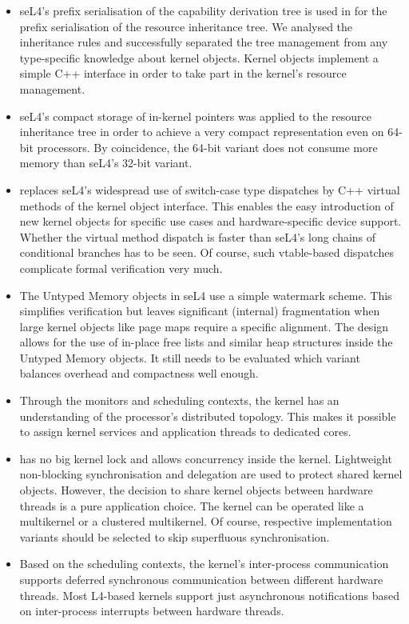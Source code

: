 \begin{itemize}
\item seL4's prefix serialisation of the capability derivation tree is used in \mythos for the prefix serialisation of the resource inheritance tree. We analysed the inheritance rules and successfully separated the tree management from any type-specific knowledge about kernel objects. Kernel objects implement a simple C++ interface in order to take part in the kernel's resource management.
\item seL4's compact storage of in-kernel pointers was applied to the resource inheritance tree in order to achieve a very compact representation even on 64-bit processors. By coincidence, the 64-bit variant does not consume more memory than seL4's 32-bit variant. 
\item \mythos replaces seL4's widespread use of switch-case type dispatches by C++ virtual methods of the kernel object interface. This enables the easy introduction of new kernel objects for specific use cases and hardware-specific device support. Whether the virtual method dispatch is faster than seL4's long chains of conditional branches has to be seen. Of course, such vtable-based dispatches complicate formal verification very much. 
\item The Untyped Memory objects in seL4 use a simple watermark scheme. This simplifies verification but leaves significant (internal) fragmentation when large kernel objects like page maps require a specific alignment. The \mythos design allows for the use of in-place free lists and similar heap structures inside the Untyped Memory objects. It still needs to be evaluated which variant balances overhead and compactness well enough.
\item Through the monitors and scheduling contexts, the \mythos kernel has an understanding of the processor's distributed topology. This makes it possible to assign kernel services and application threads to dedicated cores.
\item \mythos has no big kernel lock and allows concurrency inside the kernel. Lightweight non-blocking synchronisation and delegation are used to protect shared kernel objects. However, the decision to share kernel objects between hardware threads is a pure application choice. The kernel can be operated like a multikernel or a clustered multikernel. Of course, respective implementation variants should be selected to skip superfluous synchronisation.
\item Based on the scheduling contexts, the kernel's inter-process communication supports deferred synchronous communication between different hardware threads. Most L4-based kernels support just asynchronous notifications based on inter-process interrupts between hardware threads.

\end{itemize}
